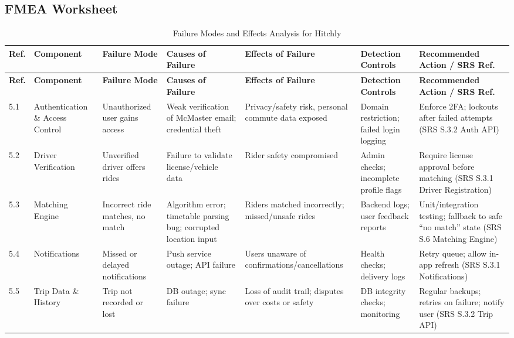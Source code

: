 \documentclass{article}
\begin{document}
\subsection{FMEA Worksheet}
\begingroup
\footnotesize
\begin{longtable}{|p{0.5cm}|p{2cm}|p{2cm}|p{2cm}|p{2cm}|p{2cm}|p{2cm}|}
\caption{Failure Modes and Effects Analysis for Hitchly} \label{tbl:FMEA} \\ 
\hline
\textbf{Ref.} & \textbf{Component} & \textbf{Failure Mode} & \textbf{Causes of Failure} & \textbf{Effects of Failure} & \textbf{Detection Controls} & \textbf{Recommended Action / SRS Ref.} \\ \hline
\endfirsthead
\hline
\textbf{Ref.} & \textbf{Component} & \textbf{Failure Mode} & \textbf{Causes of Failure} & \textbf{Effects of Failure} & \textbf{Detection Controls} & \textbf{Recommended Action / SRS Ref.} \\ \hline
\endhead
\hline
\endfoot

5.1 & Authentication \& Access Control & Unauthorized user gains access & Weak verification of McMaster email; credential theft & Privacy/safety risk, personal commute data exposed & Domain restriction; failed login logging & Enforce 2FA; lockouts after failed attempts (SRS S.3.2 Auth API) \\ \hline

5.2 & Driver Verification & Unverified driver offers rides & Failure to validate license/vehicle data & Rider safety compromised & Admin checks; incomplete profile flags & Require license approval before matching (SRS S.3.1 Driver Registration) \\ \hline

5.3 & Matching Engine & Incorrect ride matches, no match & Algorithm error; timetable parsing bug; corrupted location input & Riders matched incorrectly; missed/unsafe rides & Backend logs; user feedback reports & Unit/integration testing; fallback to safe “no match” state (SRS S.6 Matching Engine) \\ \hline

5.4 & Notifications & Missed or delayed notifications & Push service outage; API failure & Users unaware of confirmations/cancellations & Health checks; delivery logs & Retry queue; allow in-app refresh (SRS S.3.1 Notifications) \\ \hline

5.5 & Trip Data \& History & Trip not recorded or lost & DB outage; sync failure & Loss of audit trail; disputes over costs or safety & DB integrity checks; monitoring & Regular backups; retries on failure; notify user (SRS S.3.2 Trip API) \\ \hline


\end{longtable}
\end{document}
